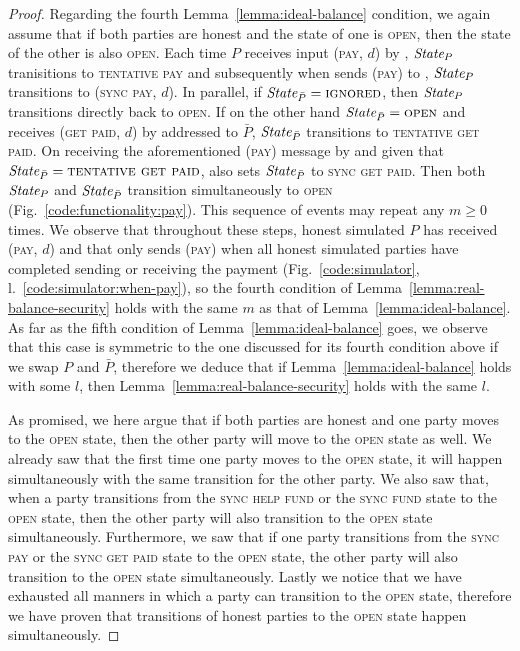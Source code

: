 \begin{proof}
  Regarding the fourth Lemma~\ref{lemma:ideal-balance} condition, we again
  assume that if both parties are honest and the state of one is \textsc{open},
  then the state of the other is also \textsc{open}. Each time $P$ receives
  input (\textsc{pay}, $d$) by \environment, $\itistate_P$ tranisitions to
  \textsc{tentative pay} and subsequently when \simulator sends (\textsc{pay})
  to \fchan, $\itistate_P$ transitions to (\textsc{sync pay}, $d$). In parallel,
  if $\itistate_{\bar{P}} = \textsc{ignored}$, then $\itistate_P$ transitions
  directly back to \textsc{open}. If on the other hand $\itistate_{\bar{P}} =
  \textsc{open}$ and \fchan receives (\textsc{get paid}, $d$) by \environment
  addressed to $\bar{P}$, $\itistate_{\bar{P}}$ transitions to \textsc{tentative
  get paid}. On receiving the aforementioned (\textsc{pay}) message by
  \simulator and given that $\itistate_{\bar{P}} = \textsc{tentative get paid}$,
  \fchan also sets $\itistate_{\bar{P}}$ to \textsc{sync get paid}. Then both
  $\itistate_P$ and $\itistate_{\bar{P}}$ transition simultaneously to
  \textsc{open} (Fig.~\ref{code:functionality:pay}). This sequence of events may
  repeat any $m \geq 0$ times. We observe that throughout these steps, honest
  simulated $P$ has received (\textsc{pay}, $d$) and that \simulator only sends
  (\textsc{pay}) when all honest simulated parties have completed sending or
  receiving the payment (Fig.~\ref{code:simulator},
  l.~\ref{code:simulator:when-pay}), so the fourth condition of
  Lemma~\ref{lemma:real-balance-security} holds with the same $m$ as that of
  Lemma~\ref{lemma:ideal-balance}. As far as the fifth condition of
  Lemma~\ref{lemma:ideal-balance} goes, we observe that this case is symmetric
  to the one discussed for its fourth condition above if we swap $P$ and
  $\bar{P}$, therefore we deduce that if Lemma~\ref{lemma:ideal-balance} holds
  with some $l$, then Lemma~\ref{lemma:real-balance-security} holds with the
  same $l$.

  As promised, we here argue that if both parties are honest and one party moves
  to the \textsc{open} state, then the other party will move to the
  \textsc{open} state as well. We already saw that the first time one party
  moves to the \textsc{open} state, it will happen simultaneously with the same
  transition for the other party. We also saw that, when a party transitions
  from the \textsc{sync help fund} or the \textsc{sync fund} state to the
  \textsc{open} state, then the other party will also transition to the
  \textsc{open} state simultaneously. Furthermore, we saw that if one party
  transitions from the \textsc{sync pay} or the \textsc{sync get paid} state to
  the \textsc{open} state, the other party will also transition to the
  \textsc{open} state simultaneously. Lastly we notice that we have exhausted
  all manners in which a party can transition to the \textsc{open} state,
  therefore we have proven that transitions of honest parties to the
  \textsc{open} state happen simultaneously.


\end{proof}

